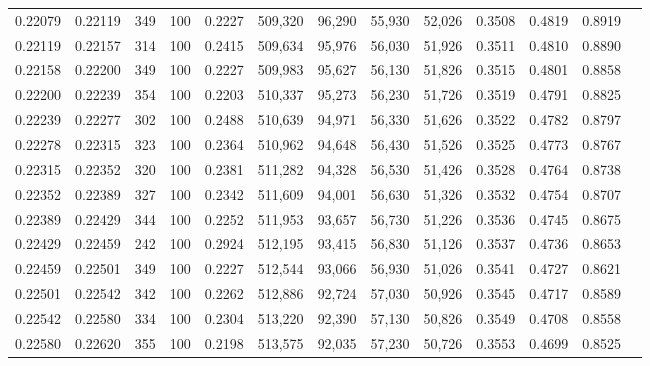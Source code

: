\begin{tabular}{rrrrrrrrrrrrr}
0.22079 & 0.22119 &   349 & 100 &                                     0.2227 & 509,320 &  96,290 &  55,930 &  52,026 & 0.3508 & 0.4819 & 0.8919 \\
0.22119 & 0.22157 &   314 & 100 &                                     0.2415 & 509,634 &  95,976 &  56,030 &  51,926 & 0.3511 & 0.4810 & 0.8890 \\
0.22158 & 0.22200 &   349 & 100 &                                     0.2227 & 509,983 &  95,627 &  56,130 &  51,826 & 0.3515 & 0.4801 & 0.8858 \\
0.22200 & 0.22239 &   354 & 100 &                                     0.2203 & 510,337 &  95,273 &  56,230 &  51,726 & 0.3519 & 0.4791 & 0.8825 \\
0.22239 & 0.22277 &   302 & 100 &                                     0.2488 & 510,639 &  94,971 &  56,330 &  51,626 & 0.3522 & 0.4782 & 0.8797 \\
0.22278 & 0.22315 &   323 & 100 &                                     0.2364 & 510,962 &  94,648 &  56,430 &  51,526 & 0.3525 & 0.4773 & 0.8767 \\
0.22315 & 0.22352 &   320 & 100 &                                     0.2381 & 511,282 &  94,328 &  56,530 &  51,426 & 0.3528 & 0.4764 & 0.8738 \\
0.22352 & 0.22389 &   327 & 100 &                                     0.2342 & 511,609 &  94,001 &  56,630 &  51,326 & 0.3532 & 0.4754 & 0.8707 \\
0.22389 & 0.22429 &   344 & 100 &                                     0.2252 & 511,953 &  93,657 &  56,730 &  51,226 & 0.3536 & 0.4745 & 0.8675 \\
0.22429 & 0.22459 &   242 & 100 &                                     0.2924 & 512,195 &  93,415 &  56,830 &  51,126 & 0.3537 & 0.4736 & 0.8653 \\
0.22459 & 0.22501 &   349 & 100 &                                     0.2227 & 512,544 &  93,066 &  56,930 &  51,026 & 0.3541 & 0.4727 & 0.8621 \\
0.22501 & 0.22542 &   342 & 100 &                                     0.2262 & 512,886 &  92,724 &  57,030 &  50,926 & 0.3545 & 0.4717 & 0.8589 \\
0.22542 & 0.22580 &   334 & 100 &                                     0.2304 & 513,220 &  92,390 &  57,130 &  50,826 & 0.3549 & 0.4708 & 0.8558 \\
0.22580 & 0.22620 &   355 & 100 &                                     0.2198 & 513,575 &  92,035 &  57,230 &  50,726 & 0.3553 & 0.4699 & 0.8525 \\

\end{tabular}
